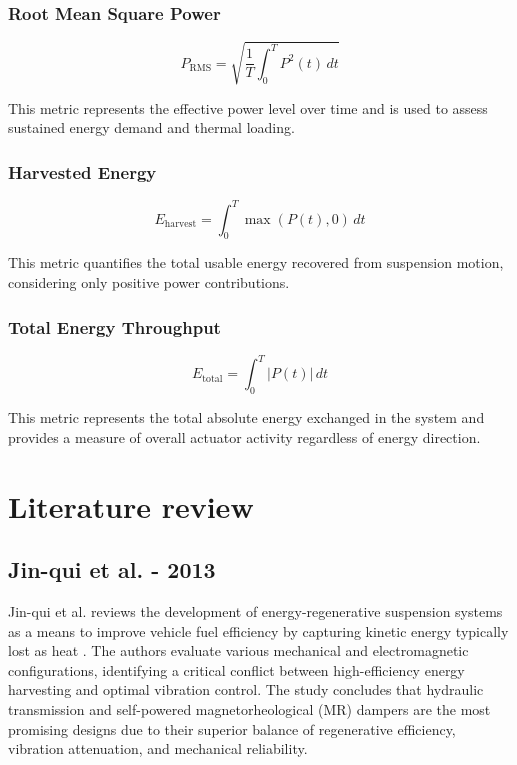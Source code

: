 \subsubsection{Root Mean Square Power}

\begin{equation}
P_{\mathrm{RMS}} = \sqrt{\frac{1}{T} \int_0^T P^2(t)\,dt}
\end{equation}

This metric represents the effective power level over time and is used to assess sustained energy demand and thermal loading.

\subsubsection{Harvested Energy}

\begin{equation}
E_{\mathrm{harvest}} = \int_0^T \max\left(P(t), 0\right)\,dt
\end{equation}

This metric quantifies the total usable energy recovered from suspension motion, considering only positive power contributions.

\subsubsection{Total Energy Throughput}

\begin{equation}
E_{\mathrm{total}} = \int_0^T \left|P(t)\right|\,dt
\end{equation}

This metric represents the total absolute energy exchanged in the system and provides a measure of overall actuator activity regardless of energy direction.

 \section{Literature review}

 \subsection{Jin-qui et al. - 2013}
Jin-qui et al. reviews the development of energy-regenerative suspension systems as a means to improve vehicle fuel efficiency by capturing kinetic energy typically lost as heat \cite{jin2013review}. The authors evaluate various mechanical and electromagnetic configurations, identifying a critical conflict between high-efficiency energy harvesting and optimal vibration control. The study concludes that hydraulic transmission and self-powered magnetorheological (MR) dampers are the most promising designs due to their superior balance of regenerative efficiency, vibration attenuation, and mechanical reliability.

